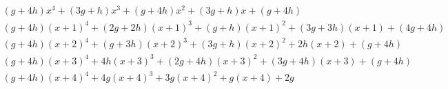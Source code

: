 \documentclass[a4paper, 12pt]{extarticle}
\begin{document}
$$\begin{array}{l}
(g + 4h)x^4 + (3g + h)x^3 + (g + 4h)x^2 + (3g + h)x + (g + 4h) \\
(g + 4h)(x+1)^4 + (2g + 2h)(x+1)^3 + (g + h)(x+1)^2 + (3g + 3h)(x+1) + (4g + 4h) \\
(g + 4h)(x+2)^4 + (g + 3h)(x+2)^3 + (3g + h)(x+2)^2 + 2h(x+2) + (g + 4h) \\
(g + 4h)(x+3)^4 + 4h(x+3)^3 + (2g + 4h)(x+3)^2 + (3g + 4h)(x+3) + (g + 4h) \\
(g + 4h)(x+4)^4 + 4g(x+4)^3 + 3g(x+4)^2 + g(x+4) + 2g \\
\end{array}$$
\end{document}

